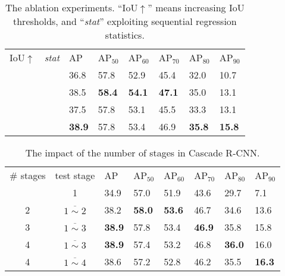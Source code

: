 \documentclass[10pt,twocolumn,letterpaper]{article}
\newcommand{\cmark}{\ding{51}}
\newcommand{\bd}[1]{\textbf{#1}}
\newcommand{\tablestyle}[2]{\setlength{\tabcolsep}{#1}\renewcommand{\arraystretch}{#2}\centering\footnotesize}
\begin{document}
\begin{table}[t]
\tablestyle{1.8pt}{1.2}
\begin{tabular}{cx{18}|x{22}|x{22}x{22}x{22}x{22}x{22}}
IoU$\uparrow$ & \textit{stat} & AP & AP$_{50}$ & AP$_{60}$ &AP$_{70}$ &AP$_{80}$ &AP$_{90}$\\ [.1em]\shline
& &36.8 &57.8  &52.9 &45.4 &32.0  &10.7\\
\cmark & &38.5 &\bd{58.4}  &\bd{54.1} &\bd{47.1} &35.0  &13.1\\
&\cmark &37.5 &57.8  &53.1 &45.5 &33.3  &13.1\\
\cmark &\cmark &\bd{38.9} &57.8  &53.4 &46.9 &\bd{35.8} &\bd{15.8}\\
\end{tabular}\vspace{2mm}
\caption{The ablation experiments. ``IoU$\uparrow$'' means increasing IoU thresholds, and ``\textit{stat}'' exploiting sequential regression statistics.}
\label{tab:ablation}
\end{table}

\begin{table}[t]
\tablestyle{1.8pt}{1.2}
\begin{tabular}{c|c|x{22}|x{22}x{22}x{22}x{22}x{22}}
\# stages &test stage & AP & AP$_{50}$ & AP$_{60}$ &AP$_{70}$ &AP$_{80}$ &AP$_{90}$\\ [.1em] &1 &34.9 &57.0  &51.9 &43.6 &29.7  &7.1\\
2 &$\overline{1\sim{2}}$ &38.2 &\bd{58.0}  &\bd{53.6} &46.7 &34.6  &13.6\\
3 &$\overline{1\sim{3}}$ &\bd{38.9} &57.8  &53.4 &\bd{46.9} &35.8  &15.8\\
4 &$\overline{1\sim{3}}$ &\bd{38.9} &57.4  &53.2 &46.8 &\bd{36.0}  &16.0\\
4 &$\overline{1\sim{4}}$ &38.6 &57.2  &52.8 &46.2 &35.5  &\bd{16.3}\\
\end{tabular}\vspace{2mm}
\caption{The impact of the number of stages in Cascade R-CNN.}
\label{tab:cascade stage}
\end{table}
\end{document}
